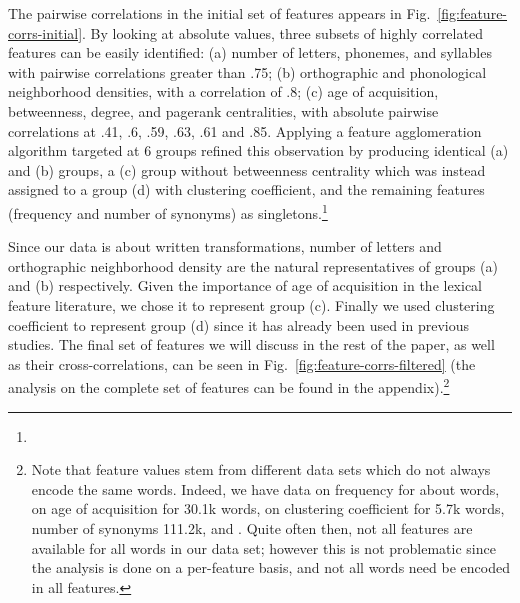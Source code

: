 \begin{new}

The pairwise correlations in the initial set of features appears in Fig.~\ref{fig:feature-corrs-initial}.
By looking at absolute values, three subsets of highly correlated features can be easily identified:
(a) number of letters, phonemes, and syllables with pairwise correlations greater than .75;
(b) orthographic and phonological neighborhood densities, with a correlation of .8;
(c) age of acquisition, betweenness, degree, and pagerank centralities, with absolute pairwise correlations at .41, .6, .59, .63, .61 and .85.
Applying a feature agglomeration algorithm targeted at 6 groups refined this observation by producing identical (a) and (b) groups, a (c) group without betweenness centrality which was instead assigned to a group (d) with clustering coefficient, and the remaining features (frequency and number of synonyms) as singletons.\footnote{
}

Since our data is about written transformations, number of letters and orthographic neighborhood density are the natural representatives of groups (a) and (b) respectively.
Given the importance of age of acquisition in the lexical feature literature, we chose it to represent group (c).
Finally we used clustering coefficient to represent group (d) since it has already been used in previous studies.
The final set of features we will discuss in the rest of the paper, as well as their cross-correlations, can be seen in Fig.~\ref{fig:feature-corrs-filtered} (the analysis on the complete set of features can be found in the appendix).\footnote{
Note that feature values stem from different data sets which do not always encode the same words.
Indeed, we have data on frequency for about  words, on age of acquisition for 30.1k words, on clustering coefficient for 5.7k words, number of synonyms 111.2k, and .
Quite often then, not all features are available for all words in our data set;
however this is not problematic since the analysis is done on a per-feature basis, and not all words need be encoded in all features.}

\end{new}

